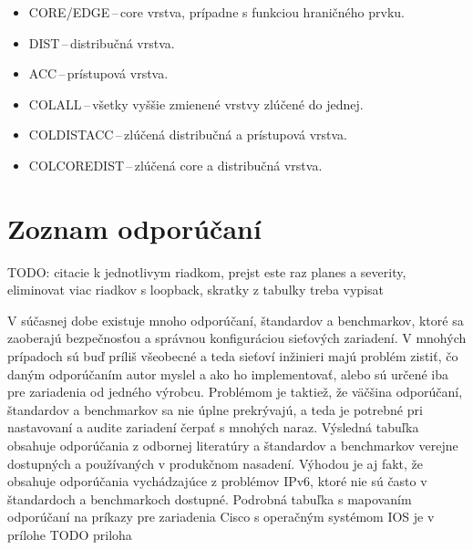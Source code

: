 \begin{itemize}
	\item CORE/EDGE\,--\,core vrstva, prípadne s funkciou hraničného prvku.
	\item DIST\,--\,distribučná vrstva.
	\item ACC\,--\,prístupová vrstva.
	\item COLALL\,--\,všetky vyššie zmienené vrstvy zlúčené do jednej.
	\item COLDISTACC\,--\,zlúčená distribučná a prístupová vrstva.
	\item COLCOREDIST\,--\,zlúčená core a distribučná vrstva.
\end{itemize}


\section{Zoznam odporúčaní}
 TODO: citacie k jednotlivym riadkom, prejst este raz planes a severity, eliminovat viac riadkov s loopback, skratky z tabulky treba vypisat                                                                                                                                                                                                                                                                                                                                                                                                                                                                                                                                                                                                     

V súčasnej dobe existuje mnoho odporúčaní, štandardov a benchmarkov, ktoré sa zaoberajú bezpečnosťou a správnou konfiguráciou sieťových zariadení. V mnohých prípadoch sú buď príliš všeobecné a teda sieťoví inžinieri majú problém zistiť, čo daným odporúčaním autor myslel a ako ho implementovať, alebo sú určené iba pre zariadenia od jedného výrobcu. Problémom je taktiež, že väčšina odporúčaní, štandardov a benchmarkov sa nie úplne prekrývajú, a teda je potrebné pri nastavovaní a audite zariadení čerpať s mnohých naraz. Výsledná tabuľka obsahuje odporúčania z odbornej literatúry a štandardov a benchmarkov verejne dostupných a používaných v produkčnom nasadení. Výhodou je aj fakt, že obsahuje odporúčania vychádzajúce z problémov IPv6, ktoré nie sú často v štandardoch a benchmarkoch dostupné. Podrobná tabuľka s mapovaním odporúčaní na príkazy pre zariadenia Cisco s operačným systémom IOS je v prílohe TODO priloha %

